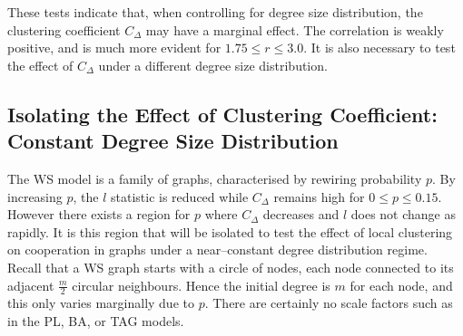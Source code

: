 \FloatBarrier
{}
\FloatBarrier
{} \FloatBarrier

These tests indicate that, when controlling for degree size distribution, the clustering coefficient $C_\Delta$ may have a marginal effect. The correlation is weakly positive, and is much more evident for $1.75\leq r\leq 3.0$. It is also necessary to test the effect of $C_\Delta$ under a different degree size distribution. \\

\subsection{Isolating the Effect of Clustering Coefficient: Constant Degree Size Distribution}
The WS model is a family of graphs, characterised by rewiring probability $p$. By increasing $p$, the $l$ statistic is reduced while $C_\Delta$ remains high for $0\leq p\leq0.15$. However there exists a region for $p$ where $C_\Delta$ decreases and $l$ does not change as rapidly. It is this region that will be isolated to test the effect of local clustering on cooperation in graphs under a near--constant degree distribution regime. Recall that a WS graph starts with a circle of nodes, each node connected to its adjacent $\frac{m}{2}$ circular neighbours. Hence the initial degree is $m$ for each node, and this only varies marginally due to $p$. There are certainly no scale factors such as in the PL, BA, or TAG models. \\


